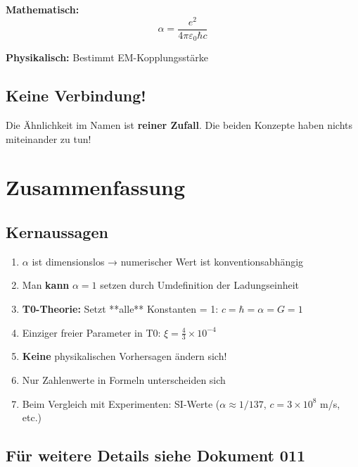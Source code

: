 	\textbf{Mathematisch:}
	\begin{equation}
		\alpha = \frac{e^2}{4\pi\varepsilon_0\hbar c}
	\end{equation}
	
	\textbf{Physikalisch:} Bestimmt EM-Kopplungsstärke
	
	\subsection{Keine Verbindung!}
	
	Die Ähnlichkeit im Namen ist \textbf{reiner Zufall}. Die beiden Konzepte haben nichts miteinander zu tun!
	
	\section{Zusammenfassung}
	
	\subsection{Kernaussagen}
	
	\begin{enumerate}
		\item $\alpha$ ist dimensionslos → numerischer Wert ist konventionsabhängig
		
		\item Man \textbf{kann} $\alpha = 1$ setzen durch Umdefinition der Ladungseinheit
		
		\item \textbf{T0-Theorie:} Setzt **alle** Konstanten = 1: $c = \hbar = \alpha = G = 1$
		
		\item Einziger freier Parameter in T0: $\xi = \frac{4}{3} \times 10^{-4}$
		
		\item \textbf{Keine} physikalischen Vorhersagen ändern sich!
		
		\item Nur Zahlenwerte in Formeln unterscheiden sich
		
		\item Beim Vergleich mit Experimenten: SI-Werte ($\alpha \approx 1/137$, $c = 3 \times 10^8$ m/s, etc.)
	\end{enumerate}
	
	\subsection{Für weitere Details siehe Dokument 011}
	
